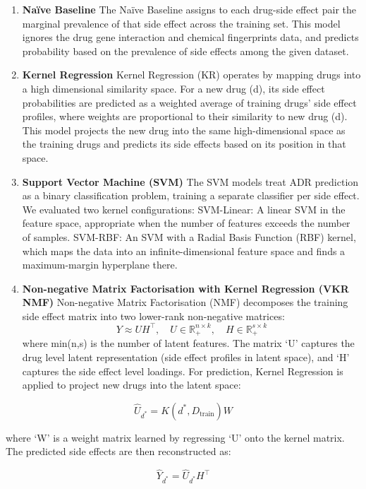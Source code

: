 \documentclass{article}
\begin{document}
\begin{enumerate}
\def\labelenumi{\arabic{enumi}.}
\item
  \textbf{Naïve Baseline} The Naïve Baseline assigns to each drug-side
  effect pair the marginal prevalence of that side effect across the
  training set. This model ignores the drug gene interaction and
  chemical fingerprints data, and predicts probability based on the
  prevalence of side effects among the given dataset.
\item
  \textbf{Kernel Regression} Kernel Regression (KR) operates by mapping
  drugs into a high dimensional similarity space. For a new drug (d),
  its side effect probabilities are predicted as a weighted average of
  training drugs' side effect profiles, where weights are proportional
  to their similarity to new drug (d). This model projects the new drug
  into the same high-dimensional space as the training drugs and
  predicts its side effects based on its position in that space.
\item
  \textbf{Support Vector Machine (SVM)} The SVM models treat ADR
  prediction as a binary classification problem, training a separate
  classifier per side effect. We evaluated two kernel configurations:
  SVM-Linear: A linear SVM in the feature space, appropriate when the
  number of features exceeds the number of samples. SVM-RBF: An SVM with
  a Radial Basis Function (RBF) kernel, which maps the data into an
  infinite-dimensional feature space and finds a maximum-margin
  hyperplane there.
\item
  \textbf{Non-negative Matrix Factorisation with Kernel Regression (VKR
  NMF)} Non-negative Matrix Factorisation (NMF) decomposes the training
  side effect matrix into two lower-rank non-negative matrices:
  \[Y \approx UH^\top, \quad U \in \mathbb{R}^{n \times k}_+, \quad H \in \mathbb{R}^{s \times k}_+\]
  where min(n,s) is the number of latent features. The matrix `U'
  captures the drug level latent representation (side effect profiles in
  latent space), and `H' captures the side effect level loadings. For
  prediction, Kernel Regression is applied to project new drugs into the
  latent space:
\end{enumerate}

\[\hat{U}_{d^*} = K(d^*, D_{\text{train}}) W\]

where `W' is a weight matrix learned by regressing `U' onto the kernel
matrix. The predicted side effects are then reconstructed as:

\[\hat{Y}_{d^*} = \hat{U}_{d^*} H^\top\]
\end{document}
